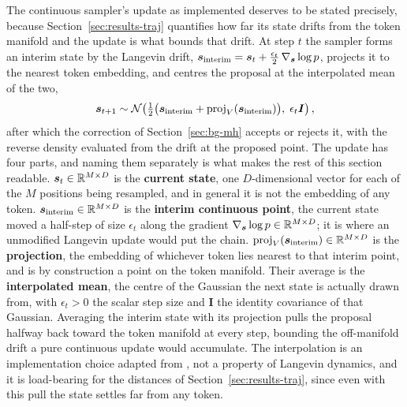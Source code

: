 The continuous sampler's update as implemented deserves to be stated precisely, because Section~\ref{sec:results-traj} quantifies how far its state drifts from the token manifold and the update is what bounds that drift. At step $t$ the sampler forms an interim state by the Langevin drift, $\bm{s}_{\text{interim}} = \bm{s}_t + \tfrac{\epsilon_t}{2}\,\nabla_{\bm{s}}\log p$, projects it to the nearest token embedding, and centres the proposal at the interpolated mean of the two,
\begin{equation}
    \bm{s}_{t+1} \sim \mathcal{N}\!\left(\tfrac{1}{2}\bigl(\bm{s}_{\text{interim}} + \mathrm{proj}_V(\bm{s}_{\text{interim}})\bigr),\; \epsilon_t \bm{I}\right),
    \label{eq:meth-cls-update}
\end{equation}
after which the correction of Section~\ref{sec:bg-mh} accepts or rejects it, with the reverse density evaluated from the drift at the proposed point. The update has four parts, and naming them separately is what makes the rest of this section readable. $\bm{s}_t \in \mathbb{R}^{M \times D}$ is the \textbf{current state}, one $D$-dimensional vector for each of the $M$ positions being resampled, and in general it is not the embedding of any token. $\bm{s}_{\text{interim}} \in \mathbb{R}^{M \times D}$ is the \textbf{interim continuous point}, the current state moved a half-step of size $\epsilon_t$ along the gradient $\nabla_{\bm{s}}\log p \in \mathbb{R}^{M \times D}$; it is where an unmodified Langevin update would put the chain. $\mathrm{proj}_V(\bm{s}_{\text{interim}}) \in \mathbb{R}^{M \times D}$ is the \textbf{projection}, the embedding of whichever token lies nearest to that interim point, and is by construction a point on the token manifold. Their average is the \textbf{interpolated mean}, the centre of the Gaussian the next state is actually drawn from, with $\epsilon_t > 0$ the scalar step size and $\bm{I}$ the identity covariance of that Gaussian. Averaging the interim state with its projection pulls the proposal halfway back toward the token manifold at every step, bounding the off-manifold drift a pure continuous update would accumulate. The interpolation is an implementation choice adapted from \citet{kumar2022gradient}, not a property of Langevin dynamics, and it is load-bearing for the distances of Section~\ref{sec:results-traj}, since even with this pull the state settles far from any token.

